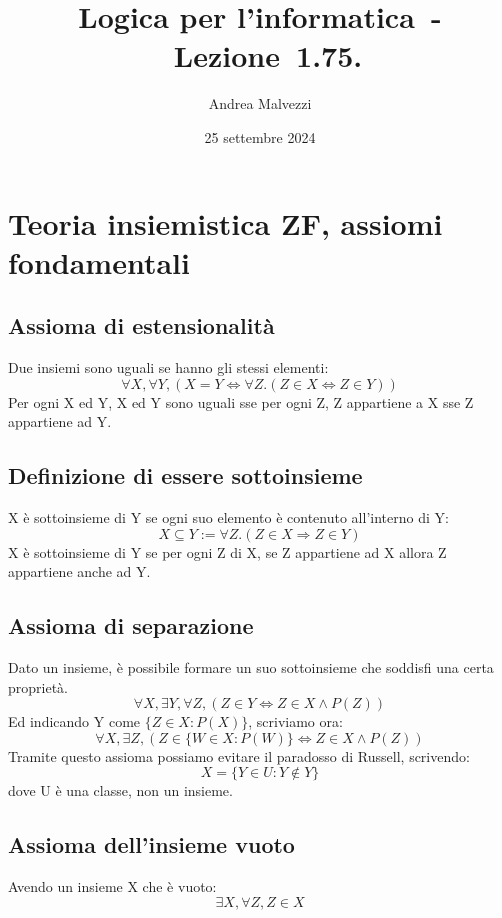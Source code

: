 \documentclass[12pt]{article}
\title{\textbf{Logica per l'informatica~-~Lezione~1.75.\\}}
\date{25 settembre 2024}
\author{Andrea Malvezzi}
\begin{document}
\maketitle
\pagebreak
\tableofcontents
\pagebreak
\section{Teoria insiemistica ZF, assiomi fondamentali}
\subsection{Assioma di estensionalità}
Due insiemi sono uguali se hanno gli stessi elementi:
\begin{equation}
    \forall X, \forall Y, (X = Y \Leftrightarrow \forall Z. (Z \in X \Leftrightarrow Z \in Y)) \label{ass:estensionalità}
\end{equation}
Per ogni X ed Y, X ed Y sono uguali sse per ogni Z, Z appartiene a X sse Z appartiene ad Y.
\subsection{Definizione di essere sottoinsieme}
X è sottoinsieme di Y se ogni suo elemento è contenuto all'interno di Y:
\begin{equation}
    X \subseteq Y := \forall Z. (Z \in X \Rightarrow Z \in Y) \label{ass:sottoinsieme}
\end{equation}
X è sottoinsieme di Y se per ogni Z di X, se Z appartiene ad X allora Z appartiene anche ad Y.
\subsection{Assioma di separazione}
Dato un insieme, è possibile formare un suo sottoinsieme che soddisfi una certa proprietà.
\[
    \forall X, \exists Y, \forall Z, (Z \in Y \Leftrightarrow Z \in X \wedge P(Z))
\]
Ed indicando Y come $\{Z \in X : P(X)\}$, scriviamo ora:
\begin{equation}
    \forall X, \exists Z, (Z \in \{W \in X : P(W)\} \Leftrightarrow Z \in X \wedge P(Z)) \label{ass:separazione}
\end{equation}
Tramite questo assioma possiamo evitare il paradosso di Russell, scrivendo: 
\[
    X = \{Y \in U : Y \notin Y\}
\]
dove U è una classe, non un insieme.
\subsection{Assioma dell'insieme vuoto}
Avendo un insieme X che è vuoto:
\begin{equation}
    \exists X, \forall Z, Z \in X \label{ass:insieme_vuoto}
\end{equation}
\end{document}
